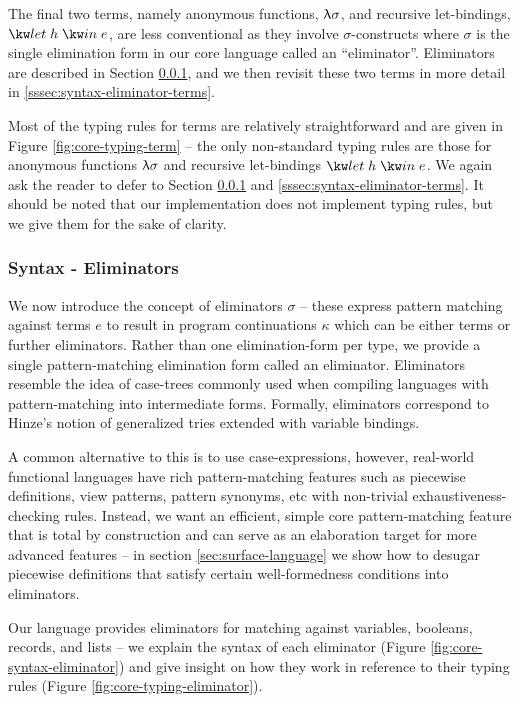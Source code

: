 The final two terms, namely anonymous functions, $\uplambda{\sigma}$, and recursive let-bindings, $\exLetRecMutual{h}{e}$, are less conventional as they involve $\sigma$-constructs where $\sigma$ is the single elimination form in our core language called an ``eliminator''. Eliminators are described in Section \ref{sssec:syntax-eliminator}, and we then revisit these two terms in more detail in \ref{sssec:syntax-eliminator-terms}. 


\noindent
Most of the typing rules for terms are relatively straightforward and are given in Figure \ref{fig:core-typing-term} -- the only non-standard typing rules are those for anonymous functions $\uplambda{\sigma}$ and recursive let-bindings $\exLetRecMutual{h}{e}$. We again ask the reader to defer to Section \ref{sssec:syntax-eliminator} and \ref{sssec:syntax-eliminator-terms}. It should be noted that our implementation does not implement typing rules, but we give them for the sake of clarity.



\subsubsection{Syntax - Eliminators}
\label{sssec:syntax-eliminator}
We now introduce the concept of eliminators $\sigma$ -- these express pattern matching against terms $e$ to result in program continuations $\kappa$ which can be either terms or further eliminators. Rather than one elimination-form per type, we provide a single pattern-matching elimination form called an eliminator. Eliminators resemble the idea of case-trees commonly used when compiling languages with pattern-matching into intermediate forms. Formally, eliminators correspond to Hinze's notion of generalized tries \cite{hinze00} extended with variable bindings. 

A common alternative to this is to use case-expressions, however, real-world functional languages have rich pattern-matching features such as piecewise definitions, view patterns, pattern synonyms, etc with non-trivial exhaustiveness-checking rules. Instead, we want an efficient, simple core pattern-matching feature that is total by construction and can serve as an elaboration target for more advanced features -- in section \ref{sec:surface-language} we show how to desugar piecewise definitions that satisfy certain well-formedness conditions into eliminators. 

Our language provides eliminators for matching against variables, booleans, records, and lists -- we explain the syntax of each eliminator (Figure \ref{fig:core-syntax-eliminator}) and give insight on how they work in reference to their typing rules (Figure \ref{fig:core-typing-eliminator}). 


